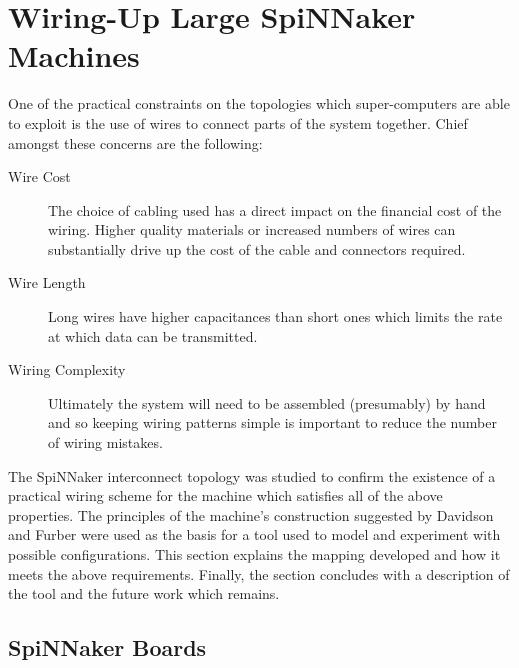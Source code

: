 	\section{Wiring-Up Large SpiNNaker Machines}
		
		
		One of the practical constraints on the topologies which super-computers are
		able to exploit is the use of wires to connect parts of the system together.
		Chief amongst these concerns are the following:
		
		\begin{description}
			
			\item[Wire Cost] The choice of cabling used has a direct impact on the
			financial cost of the wiring. Higher quality materials or increased
			numbers of wires can substantially drive up the cost of the cable and
			connectors required.
			
			\item[Wire Length] Long wires have higher capacitances than short ones
			which limits the rate at which data can be transmitted.
			
			\item[Wiring Complexity] Ultimately the system will need to be assembled
			(presumably) by hand and so keeping wiring patterns simple is important to
			reduce the number of wiring mistakes.
			
		\end{description}
		
		The SpiNNaker interconnect topology was studied to confirm the existence of
		a practical wiring scheme for the machine which satisfies all of the above
		properties. The principles of the machine's construction suggested by
		Davidson \cite{davidsonWiring} and Furber \cite{furber13email} were used as
		the basis for a tool used to model and experiment with possible
		configurations. This section explains the mapping developed and how it
		meets the above requirements. Finally, the section concludes with a
		description of the tool and the future work which remains.
		
		\subsection{SpiNNaker Boards}
			
